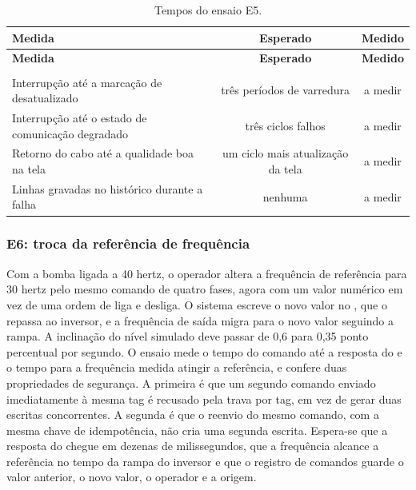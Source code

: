 
{\renewcommand{\arraystretch}{1.3}\small
\begin{xltabular}{\textwidth}{Xcc}
        \caption{Tempos do ensaio E5.}
        \label{tab:cap7_e5}\\
        \hline
        \textbf{Medida} & \textbf{Esperado} & \textbf{Medido} \\
        \hline
        \endfirsthead
        \hline
        \textbf{Medida} & \textbf{Esperado} & \textbf{Medido} \\
        \hline
        \endhead
        \endfoot
         \\
        \endlastfoot
        Interrupção até a marcação de desatualizado & três períodos de varredura & a medir \\
        \hline
        Interrupção até o estado de comunicação degradado & três ciclos falhos & a medir \\
        \hline
        Retorno do cabo até a qualidade boa na tela & um ciclo mais atualização da tela & a medir \\
        \hline
        Linhas gravadas no histórico durante a falha & nenhuma & a medir \\
        \hline
\end{xltabular}}


\subsubsection{E6: troca da referência de frequência}

\par Com a bomba ligada a 40 hertz, o operador altera a frequência de referência para 30 hertz pelo mesmo comando de quatro fases, agora com um valor numérico em vez de uma ordem de liga e desliga. O sistema escreve o novo valor no , que o repassa ao inversor, e a frequência de saída migra para o novo valor seguindo a rampa. A inclinação do nível simulado deve passar de 0,6 para 0,35 ponto percentual por segundo. O ensaio mede o tempo do comando até a resposta do  e o tempo para a frequência medida atingir a referência, e confere duas propriedades de segurança. A primeira é que um segundo comando enviado imediatamente à mesma tag é recusado pela trava por tag, em vez de gerar duas escritas concorrentes. A segunda é que o reenvio do mesmo comando, com a mesma chave de idempotência, não cria uma segunda escrita. Espera-se que a resposta do  chegue em dezenas de milissegundos, que a frequência alcance a referência no tempo da rampa do inversor e que o registro de comandos guarde o valor anterior, o novo valor, o operador e a origem.

